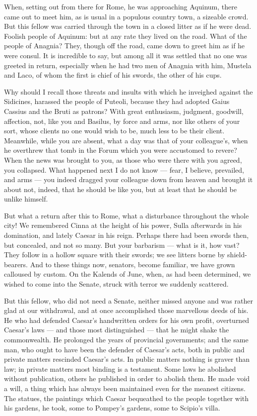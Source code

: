  When, setting out from there for Rome, he was approaching Aquinum, there came out to meet him, as is usual in a populous country town, a sizeable crowd. But this fellow was carried through the town in a closed litter as if he were dead. Foolish people of Aquinum: but at any rate they lived on the road. What of the people of Anagnia? They, though off the road, came down to greet him as if he were consul. It is incredible to say, but among all it was settled that no one was greeted in return, especially when he had two men of Anagnia with him, Mustela and Laco, of whom the first is chief of his swords, the other of his cups.

 Why should I recall those threats and insults with which he inveighed against the Sidicines, harassed the people of Puteoli, because they had adopted Gaius Cassius and the Bruti as patrons? With great enthusiasm, judgment, goodwill, affection, not, like you and Basilus, by force and arms, nor like others of your sort, whose clients no one would wish to be, much less to be their client. Meanwhile, while you are absent, what a day was that of your colleague's, when he overthrew that tomb in the Forum which you were accustomed to revere? When the news was brought to you, as those who were there with you agreed, you collapsed. What happened next I do not know --- fear, I believe, prevailed, and arms --- you indeed dragged your colleague down from heaven and brought it about not, indeed, that he should be like you, but at least that he should be unlike himself.

 But what a return after this to Rome, what a disturbance throughout the whole city! We remembered Cinna at the height of his power, Sulla afterwards in his domination, and lately Caesar in his reign. Perhaps there had been swords then, but concealed, and not so many. But your barbarism --- what is it, how vast? They follow in a hollow square with their swords; we see litters borne by shield-bearers. And to these things now, senators, become familiar, we have grown calloused by custom. On the Kalends of June, when, as had been determined, we wished to come into the Senate, struck with terror we suddenly scattered.

 But this fellow, who did not need a Senate, neither missed anyone and was rather glad at our withdrawal, and at once accomplished those marvellous deeds of his. He who had defended Caesar's handwritten orders for his own profit, overturned Caesar's laws --- and those most distinguished --- that he might shake the commonwealth. He prolonged the years of provincial governments; and the same man, who ought to have been the defender of Caesar's acts, both in public and private matters rescinded Caesar's acts. In public matters nothing is graver than law; in private matters most binding is a testament. Some laws he abolished without publication, others he published in order to abolish them. He made void a will, a thing which has always been maintained even for the meanest citizens. The statues, the paintings which Caesar bequeathed to the people together with his gardens, he took, some to Pompey's gardens, some to Scipio's villa.

